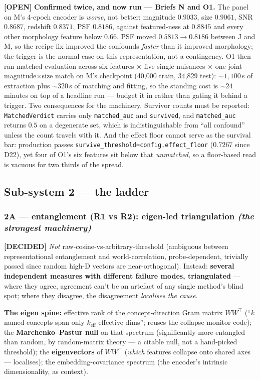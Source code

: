 \documentclass[11pt,a4paper]{article}
\newcommand{\dec}{\textcolor{decided}{\sffamily\bfseries[DECIDED]}}
\newcommand{\opn}{\textcolor{openq}{\sffamily\bfseries[OPEN]}}
\begin{document}
\opn{} \textbf{Confirmed twice, and now run --- Briefs N and O1.} The panel on M's 4-epoch encoder
is \emph{worse}, not better: magnitude $0.9033$, size $0.9061$, SNR $0.8687$, redshift $0.8371$,
PSF $0.8186$, against featured-ness at $0.8845$ and every other morphology feature below $0.66$.
PSF moved $0.5813 \to 0.8186$ between J and M, so the recipe fix improved the confounds
\emph{faster} than it improved morphology; the trigger is the normal case on this representation,
not a contingency. O1 then ran matched evaluation across six features $\times$ five single
nuisances $\times$ one joint magnitude$\times$size match on M's checkpoint (40{,}000 train,
34{,}829 test): ${\sim}1{,}100$\,s of extraction plus ${\sim}320$\,s of matching and fitting, so
the standing cost is ${\sim}24$ minutes on top of a headline run --- budget it in rather than
gating it behind a trigger. Two consequences for the machinery. Survivor counts must be reported:
\texttt{MatchedVerdict} carries only \texttt{matched\_auc} and \texttt{survived}, and
\texttt{matched\_auc} returns $0.5$ on a degenerate set, which is indistinguishable from ``all
confound'' unless the count travels with it. And the effect floor cannot serve as the survival
bar: production passes \texttt{survive\_threshold=config.effect\_floor} ($0.7267$ since D22), yet
four of O1's six features sit below that \emph{unmatched}, so a floor-based read is vacuous for
two thirds of the spread.

\subsection{Sub-system 2 --- the ladder}\label{sub:ladder-machinery}

\subsubsection{2A --- entanglement (R1 vs R2): eigen-led triangulation \textnormal{\textit{(the strongest machinery)}}}
\dec{} \emph{Not} raw-cosine-vs-arbitrary-threshold (ambiguous between representational
entanglement and world-correlation, probe-dependent, trivially passed since random high-D
vectors are near-orthogonal). Instead: \textbf{several independent measures with different
failure modes, triangulated} --- where they agree, agreement can't be an artefact of any single
method's blind spot; where they disagree, the disagreement \emph{localises the cause}.

\textbf{The eigen spine:} effective rank of the concept-direction Gram matrix $WW^\top$ (``$k$
named concepts span only $k_{\text{eff}}$ effective dims''; reuses the collapse-monitor code);
the \textbf{Marchenko--Pastur null} on that spectrum (significantly more entangled than random,
by random-matrix theory --- a citable null, not a hand-picked threshold); the
\textbf{eigenvectors} of $WW^\top$ (\emph{which} features collapse onto shared axes ---
localises); the embedding-covariance spectrum (the encoder's intrinsic dimensionality, as
context).
\end{document}
